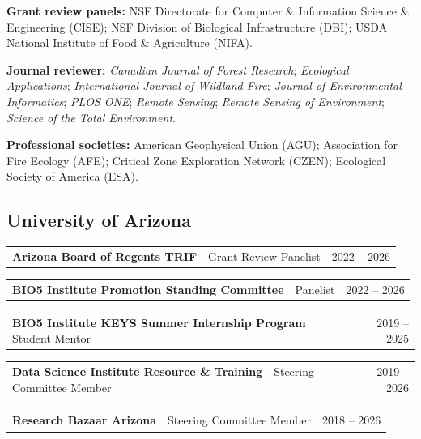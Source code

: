 \documentclass[11pt,letterpaper]{article}
\makeatletter
\newcommand{\dated}[2]{%
  \begin{tabularx}{\linewidth}{@{}X r@{}}
    #1 & {\small #2}
  \end{tabularx}\par\vspace{2pt}}
\makeatother
\begin{document}
\smallskip
\textbf{Grant review panels:} NSF Directorate for Computer \& Information Science \& Engineering (CISE); NSF Division of Biological Infrastructure (DBI); USDA National Institute of Food \& Agriculture (NIFA).

\smallskip
\textbf{Journal reviewer:} \textit{Canadian Journal of Forest Research}; \textit{Ecological Applications}; \textit{International Journal of Wildland Fire}; \textit{Journal of Environmental Informatics}; \textit{PLOS ONE}; \textit{Remote Sensing}; \textit{Remote Sensing of Environment}; \textit{Science of the Total Environment}.

\smallskip
\textbf{Professional societies:} American Geophysical Union (AGU); Association for Fire Ecology (AFE); Critical Zone Exploration Network (CZEN); Ecological Society of America (ESA).

\subsection{University of Arizona}
\dated{\textbf{Arizona Board of Regents TRIF} \,\textendash\, Grant Review Panelist}{2022 -- 2026}
\dated{\textbf{BIO5 Institute Promotion Standing Committee} \,\textendash\, Panelist}{2022 -- 2026}
\dated{\textbf{BIO5 Institute KEYS Summer Internship Program} \,\textendash\, Student Mentor}{2019 -- 2025}
\dated{\textbf{Data Science Institute Resource \& Training} \,\textendash\, Steering Committee Member}{2019 -- 2026}
\dated{\textbf{Research Bazaar Arizona} \,\textendash\, Steering Committee Member}{2018 -- 2026}

\end{document}
